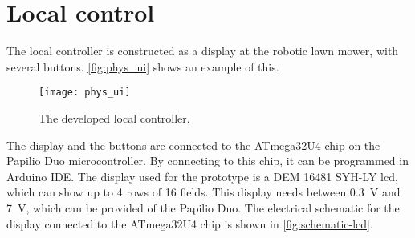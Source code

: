 \section{Local control}
The local controller is constructed as a display at the robotic lawn mower, with several buttons. \autoref{fig:phys_ui} shows an example of this. 
\begin{figure}[htb]
	\centering
	\texttt{[image: phys\_ui]}
	\caption{The developed local controller.}
	\label{fig:phys_ui}
\end{figure}

The display and the buttons are connected to the ATmega32U4 chip on the Papilio Duo microcontroller. By connecting to this chip, it can be programmed in Arduino IDE. The display used for the prototype is a DEM 16481 SYH-LY \gls{lcd}, which can show up to 4 rows of 16 fields. This display needs between \SI{0,3}{\volt} and \SI{7}{\volt}, which can be provided of the Papilio Duo. 
The electrical schematic for the display connected to the ATmega32U4 chip is shown in \autoref{fig:schematic-lcd}.

